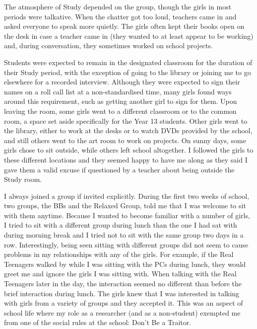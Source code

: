 The atmosphere of Study depended on the group, though the girls in most periods were talkative.  When the chatter got too loud, teachers came in and asked everyone to speak more quietly.  The girls often kept their books open on the desk in case a teacher came in (they wanted to at least appear to be working) and, during conversation, they sometimes worked on school projects.

Students were expected to remain in the designated classroom for the duration of their Study period, with the exception of going to the library or joining me to go elsewhere for a recorded interview.  Although they were expected to sign their names on a roll call list at a non-standardised time, many girls found ways around this requirement, such as getting another girl to sign for them.  Upon leaving the room, some girls went to a different classroom or to the common room, a space set aside specifically for the Year 13 students.  Other girls went to the library, either to work at the desks or to watch DVDs provided by the school, and still others went to the art room to work on projects.  On sunny days, some girls chose to sit outside, while others left school altogether.  I followed the girls to these different locations and they seemed happy to have me along as they said I gave them a valid excuse if questioned by a teacher about being outside the Study room.


I always joined a group if invited explicitly.  During the first two weeks of school, two groups, the BBs and the Relaxed Group, told me that I was welcome to sit with them anytime.  Because I wanted to become familiar with a number of girls, I tried to sit with a different group during lunch than the one I had sat with during morning break and I tried not to sit with the same group two days in a row.  Interestingly, being seen sitting with different groups did not seem to cause problems in my relationships with any of the girls.  For example, if the Real Teenagers walked by while I was sitting with the PCs during lunch, they would greet me and ignore the girls I was sitting with.  When talking with the Real Teenagers later in the day, the interaction seemed no different than before the brief interaction during lunch.  The girls knew that I was interested in talking with girls from a variety of groups and they accepted it.  This was an aspect of school life where my role as a researcher (and as a non-student) exempted me from one of the social rules at the school: Don't Be a Traitor.  

